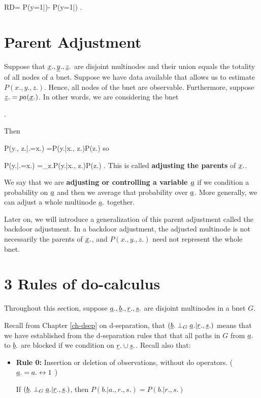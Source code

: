 \beq
RD=
P(y=1|)-
P(y=1|)
\;.
\eeq

\section{Parent Adjustment}


Suppose 
that ${\underline{x}}., {\underline{y}}., {\underline{z}}.$
are disjoint multinodes
and their union equals
 the
totality of all nodes of
a bnet. 
Suppose we have data
available that allows us  to
estimate $P(x., y., z.)$.
Hence, all nodes of the bnet
are observable.
Furthermore,
suppose ${\underline{z}}.=pa({\underline{x}}.)$.
In other words,
we are 
considering the bnet

\beq
{}
\;.
\eeq

Then

\beq
P(y., z.|\rho \rvx.=x.)
=P(y.|x., z.)P(z.)
\eeq
so

\beq
P(y.|\rho \rvx.=x.)
=\sum_{z.}P(y.|x., z.)P(z.)
\;.
\eeq
This is called
{\bf adjusting the parents}
of ${\underline{x}}.$.


We say that 
we are {\bf adjusting 
or controlling a variable ${\underline{a}}$}
if we condition 
a probability on ${\underline{a}}$ and 
then we average 
that probability over ${\underline{a}}$.
More generally, 
we can adjust a whole
multinode ${\underline{a}}.$ together.

Later on,
we will introduce 
a generalization
of 
this parent adjustment
called the 
backdoor adjustment.
In a backdoor adjustment,
the adjusted multinode
is not necessarily
 the parents of ${\underline{x}}.$, 
and $P(x., y., z.)$
need not represent the
whole bnet.



\section{3 Rules of do-calculus}
Throughout 
this section, suppose
${\underline{a}}., {\underline{b}}., {\underline{r}}., 
{\underline{s}}.$ are disjoint
multinodes in a bnet $G$.


Recall
from Chapter \ref{ch-dsep}
on d-separation,
that  $({\underline{b}}.\perp_G {\underline{a}}.|{\underline{r}}., {\underline{s}}.)$
means that 
we have established
from the d-separation
rules that 
that all 
paths in $G$
 from
${\underline{a}}.$ to
${\underline{b}}.$
are blocked
if we condition
on ${\underline{r}}.\cup {\underline{s}}.$.
Recall also that:

\begin{itemize}
\item {\bf Rule 0:} Insertion or
 deletion of
 observations, without
do operators.
(${\underline{a}}.=a. \leftrightarrow 1$ )


If 
 $({\underline{b}}.\perp_G {\underline{a}}.|{\underline{r}}.,
{\underline{s}}.)$, then
$P(b.|a., r., s.)=P(b.|r., s.)$
\end{itemize}

